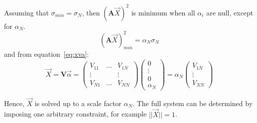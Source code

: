 \begin{algorithm}[!ht]
\begin{algorithmic}[1]
      \STATE Assuming that \(\sigma_{min} = \sigma_N\), then \((\textbf{A}\overrightarrow{X})^2\) is minimum when all $\alpha_i$ are null, except for $\alpha_N$.
      \begin{equation}
          (\textbf{A} \overrightarrow{X})_{min}^2 = \alpha_N \sigma_N
      \end{equation}
      and from equation~\ref{eq:xva}:
      \begin{equation}
          \overrightarrow{X} = 
          \textbf{V} \overrightarrow{\alpha} 
          = \begin{pmatrix} V_{11} & \dots & V_{1N} \\
           \vdots &  & \vdots \\
          V_{N1} & \dots & V_{NN}\end{pmatrix} \begin{pmatrix}0 \\ \vdots \\0 \\\alpha_N\end{pmatrix} 
          = \alpha_N \begin{pmatrix}V_{1N} \\ \vdots \\V_{NN}\end{pmatrix} 
      \end{equation} 
  
      \STATE Hence, $\overrightarrow{X}$ is solved up to a scale factor $\alpha_N$. The full system can be determined by imposing one arbitrary constraint, for example $||\overrightarrow{X}||=1$. 
  \end{algorithmic}
\end{algorithm}


